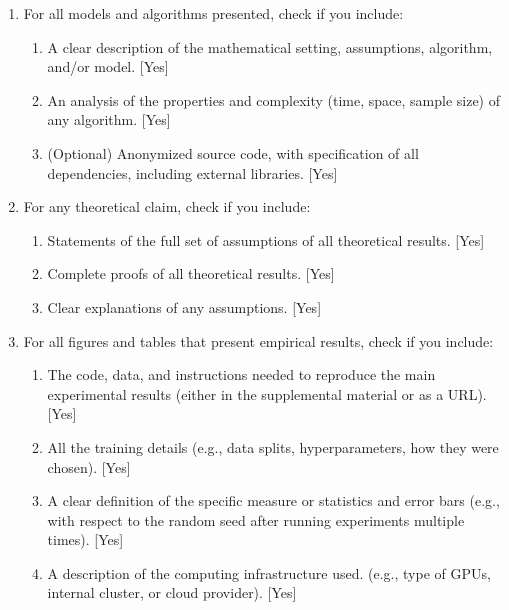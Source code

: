 \documentclass[twoside]{article}
\theoremstyle{definition}
\newcommand{\1}[1]{\scalebox{1.25}{$\mathds{1}$}\left[#1\right]}
\begin{document}
\begin{enumerate}

  \item For all models and algorithms presented, check if you include:
  \begin{enumerate}
    \item A clear description of the mathematical setting, assumptions, algorithm, and/or model. [Yes]
    \item An analysis of the properties and complexity (time, space, sample size) of any algorithm. [Yes]
    \item (Optional) Anonymized source code, with specification of all dependencies, including external libraries. [Yes]
  \end{enumerate}

  \item For any theoretical claim, check if you include:
  \begin{enumerate}
    \item Statements of the full set of assumptions of all theoretical results. [Yes]
    \item Complete proofs of all theoretical results. [Yes]
    \item Clear explanations of any assumptions. [Yes]     
  \end{enumerate}

  \item For all figures and tables that present empirical results, check if you include:
  \begin{enumerate}
    \item The code, data, and instructions needed to reproduce the main experimental results (either in the supplemental material or as a URL). [Yes]
    \item All the training details (e.g., data splits, hyperparameters, how they were chosen). [Yes]
    \item A clear definition of the specific measure or statistics and error bars (e.g., with respect to the random seed after running experiments multiple times). [Yes]
    \item A description of the computing infrastructure used. (e.g., type of GPUs, internal cluster, or cloud provider). [Yes]
  \end{enumerate}


\end{enumerate}
\end{document}
